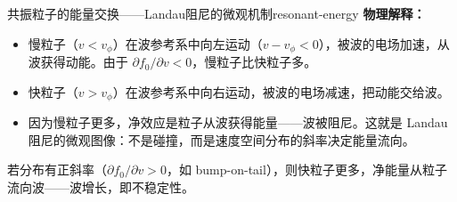 \begin{example}{共振粒子的能量交换——Landau阻尼的微观机制}{resonant-energy}
\textbf{物理解释：}
\begin{itemize}[leftmargin=*,itemsep=0pt]
\item 慢粒子（$v < v_\phi$）在波参考系中向左运动（$v-v_\phi<0$），被波的电场加速，从波获得动能。由于 $\partial f_0/\partial v<0$，慢粒子比快粒子多。
\item 快粒子（$v > v_\phi$）在波参考系中向右运动，被波的电场减速，把动能交给波。
\item 因为慢粒子更多，净效应是粒子从波获得能量——波被阻尼。这就是 Landau 阻尼的微观图像：不是碰撞，而是速度空间分布的斜率决定能量流向。
\end{itemize}

若分布有正斜率（$\partial f_0/\partial v>0$，如 bump-on-tail），则快粒子更多，净能量从粒子流向波——波增长，即不稳定性。
\end{example}

